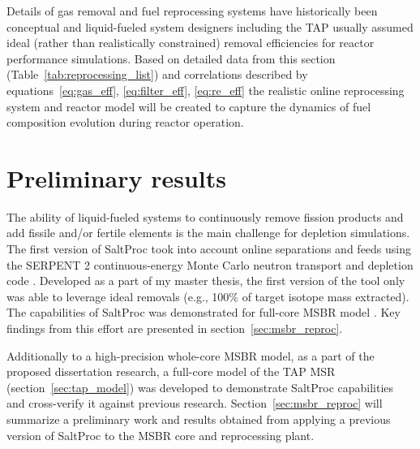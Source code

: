 Details of gas removal and fuel reprocessing systems have historically 
been conceptual and liquid-fueled system designers including the \gls{TAP} 
usually assumed ideal (rather than realistically constrained) removal 
efficiencies for reactor performance simulations.
Based on detailed data from this section (Table~\ref{tab:reprocessing_list}) and 
correlations described by equations~\ref{eq:gas_eff}, 
\ref{eq:filter_eff}, \ref{eq:re_eff} the realistic 
online reprocessing system and reactor model will be created to capture the dynamics 
of fuel composition evolution during reactor operation.


\section{Preliminary results}
The ability of liquid-fueled systems to continuously remove fission products and add 
fissile and/or fertile elements is the main challenge for depletion simulations. 
The first version of SaltProc took into account online separations and feeds using the 
SERPENT 2 continuous-energy Monte Carlo neutron transport and depletion code 
\cite{rykhlevskii_arfc/saltproc_2018}. Developed as a part of my master thesis, the
first version of the tool only was able to leverage ideal 
removals (e.g., 100\% of target isotope mass extracted). The capabilities of 
SaltProc was demonstrated for full-core \gls{MSBR} model \cite{rykhlevskii_modeling_2019}. 
Key findings from this effort are presented in section~\ref{sec:msbr_reproc}.

Additionally to a high-precision whole-core \gls{MSBR} model, as a part of 
the proposed dissertation research, a full-core model of the 
\gls{TAP} \gls{MSR} (section~\ref{sec:tap_model}) was developed to 
demonstrate SaltProc capabilities and cross-verify it against previous research. 
Section~\ref{sec:msbr_reproc} will summarize a preliminary work and results 
obtained from applying a previous version of SaltProc to the \gls{MSBR} core and 
reprocessing plant.


